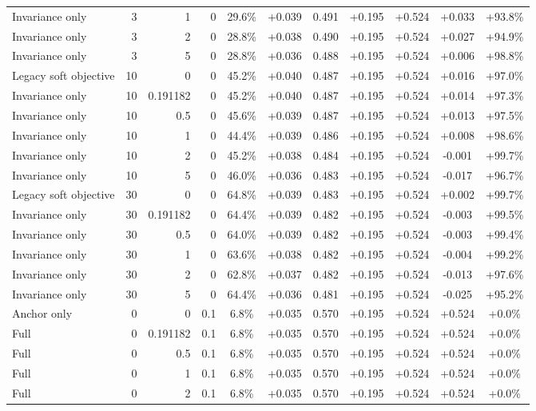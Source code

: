 \begin{table}[htbp]
\begin{tabular}{lrrrccccccc}
Invariance only & 3 & 1 & 0 & 29.6\% & +0.039 & 0.491 & +0.195 & +0.524 & +0.033 & +93.8\% \\
Invariance only & 3 & 2 & 0 & 28.8\% & +0.038 & 0.490 & +0.195 & +0.524 & +0.027 & +94.9\% \\
Invariance only & 3 & 5 & 0 & 28.8\% & +0.036 & 0.488 & +0.195 & +0.524 & +0.006 & +98.8\% \\
Legacy soft objective & 10 & 0 & 0 & 45.2\% & +0.040 & 0.487 & +0.195 & +0.524 & +0.016 & +97.0\% \\
Invariance only & 10 & 0.191182 & 0 & 45.2\% & +0.040 & 0.487 & +0.195 & +0.524 & +0.014 & +97.3\% \\
Invariance only & 10 & 0.5 & 0 & 45.6\% & +0.039 & 0.487 & +0.195 & +0.524 & +0.013 & +97.5\% \\
Invariance only & 10 & 1 & 0 & 44.4\% & +0.039 & 0.486 & +0.195 & +0.524 & +0.008 & +98.6\% \\
Invariance only & 10 & 2 & 0 & 45.2\% & +0.038 & 0.484 & +0.195 & +0.524 & -0.001 & +99.7\% \\
Invariance only & 10 & 5 & 0 & 46.0\% & +0.036 & 0.483 & +0.195 & +0.524 & -0.017 & +96.7\% \\
Legacy soft objective & 30 & 0 & 0 & 64.8\% & +0.039 & 0.483 & +0.195 & +0.524 & +0.002 & +99.7\% \\
Invariance only & 30 & 0.191182 & 0 & 64.4\% & +0.039 & 0.482 & +0.195 & +0.524 & -0.003 & +99.5\% \\
Invariance only & 30 & 0.5 & 0 & 64.0\% & +0.039 & 0.482 & +0.195 & +0.524 & -0.003 & +99.4\% \\
Invariance only & 30 & 1 & 0 & 63.6\% & +0.038 & 0.482 & +0.195 & +0.524 & -0.004 & +99.2\% \\
Invariance only & 30 & 2 & 0 & 62.8\% & +0.037 & 0.482 & +0.195 & +0.524 & -0.013 & +97.6\% \\
Invariance only & 30 & 5 & 0 & 64.4\% & +0.036 & 0.481 & +0.195 & +0.524 & -0.025 & +95.2\% \\
Anchor only & 0 & 0 & 0.1 & 6.8\% & +0.035 & 0.570 & +0.195 & +0.524 & +0.524 & +0.0\% \\
Full & 0 & 0.191182 & 0.1 & 6.8\% & +0.035 & 0.570 & +0.195 & +0.524 & +0.524 & +0.0\% \\
Full & 0 & 0.5 & 0.1 & 6.8\% & +0.035 & 0.570 & +0.195 & +0.524 & +0.524 & +0.0\% \\
Full & 0 & 1 & 0.1 & 6.8\% & +0.035 & 0.570 & +0.195 & +0.524 & +0.524 & +0.0\% \\
Full & 0 & 2 & 0.1 & 6.8\% & +0.035 & 0.570 & +0.195 & +0.524 & +0.524 & +0.0\% \\

\end{tabular}
\end{table}

